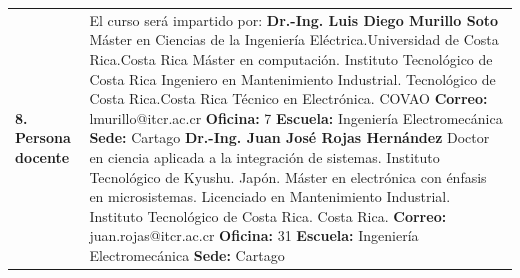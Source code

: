 \documentclass[letterpaper]{article}%
\begin{document}
\begin{tabularx}{\textwidth}{p{3cm}p{13cm}}%
\par\fontsize{12}{14}\selectfont \textbf{\textcolor{parte}{8. Persona docente}}&El curso será impartido por: \vspace*{4mm} \newline \textbf{Dr.{-}Ing. Luis Diego Murillo Soto} \vspace*{2mm} \newline Máster en Ciencias de la Ingeniería Eléctrica.Universidad de Costa Rica.Costa Rica \vspace*{1mm} \newline Máster en computación. Instituto Tecnológico de Costa Rica  \vspace*{1mm} \newline Ingeniero en Mantenimiento Industrial. Tecnológico de Costa Rica.Costa Rica \vspace*{1mm} \newline Técnico en Electrónica. COVAO \vspace*{1mm} \newline \textbf{Correo:} lmurillo@itcr.ac.cr\textbf{  Oficina:} 7 \vspace*{1mm} \newline \textbf{Escuela:} Ingeniería Electromecánica\textbf{  Sede:} Cartago \vspace*{4mm} \newline \textbf{Dr.{-}Ing. Juan José Rojas Hernández} \vspace*{2mm} \newline Doctor en ciencia aplicada a la integración de sistemas. Instituto Tecnológico de Kyushu. Japón. \vspace*{1mm} \newline Máster en electrónica con énfasis en microsistemas. Licenciado en Mantenimiento Industrial. Instituto Tecnológico de Costa Rica. Costa Rica. \vspace*{1mm} \newline \textbf{Correo:} juan.rojas@itcr.ac.cr\textbf{  Oficina:} 31 \vspace*{1mm} \newline \textbf{Escuela:} Ingeniería Electromecánica\textbf{  Sede:} Cartago \vspace*{4mm} \newline \\%
\end{tabularx}%
\end{document}
